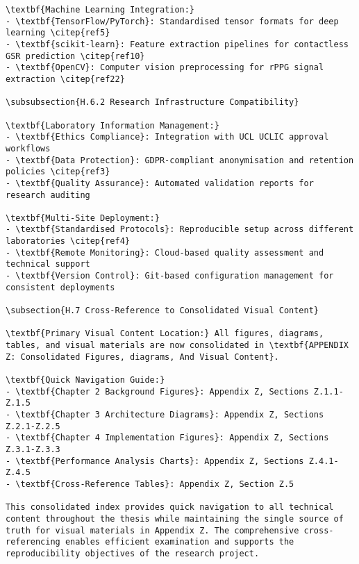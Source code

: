 \begin{verbatim}
\textbf{Machine Learning Integration:}
- \textbf{TensorFlow/PyTorch}: Standardised tensor formats for deep learning \citep{ref5}
- \textbf{scikit-learn}: Feature extraction pipelines for contactless GSR prediction \citep{ref10}
- \textbf{OpenCV}: Computer vision preprocessing for rPPG signal extraction \citep{ref22}

\subsubsection{H.6.2 Research Infrastructure Compatibility}

\textbf{Laboratory Information Management:}
- \textbf{Ethics Compliance}: Integration with UCL UCLIC approval workflows
- \textbf{Data Protection}: GDPR-compliant anonymisation and retention policies \citep{ref3}
- \textbf{Quality Assurance}: Automated validation reports for research auditing

\textbf{Multi-Site Deployment:}
- \textbf{Standardised Protocols}: Reproducible setup across different laboratories \citep{ref4}
- \textbf{Remote Monitoring}: Cloud-based quality assessment and technical support
- \textbf{Version Control}: Git-based configuration management for consistent deployments

\subsection{H.7 Cross-Reference to Consolidated Visual Content}

\textbf{Primary Visual Content Location:} All figures, diagrams, tables, and visual materials are now consolidated in \textbf{APPENDIX Z: Consolidated Figures, diagrams, And Visual Content}.

\textbf{Quick Navigation Guide:}
- \textbf{Chapter 2 Background Figures}: Appendix Z, Sections Z.1.1-Z.1.5
- \textbf{Chapter 3 Architecture Diagrams}: Appendix Z, Sections Z.2.1-Z.2.5
- \textbf{Chapter 4 Implementation Figures}: Appendix Z, Sections Z.3.1-Z.3.3
- \textbf{Performance Analysis Charts}: Appendix Z, Sections Z.4.1-Z.4.5
- \textbf{Cross-Reference Tables}: Appendix Z, Section Z.5

This consolidated index provides quick navigation to all technical content throughout the thesis while maintaining the single source of truth for visual materials in Appendix Z. The comprehensive cross-referencing enables efficient examination and supports the reproducibility objectives of the research project.
\end{verbatim}
